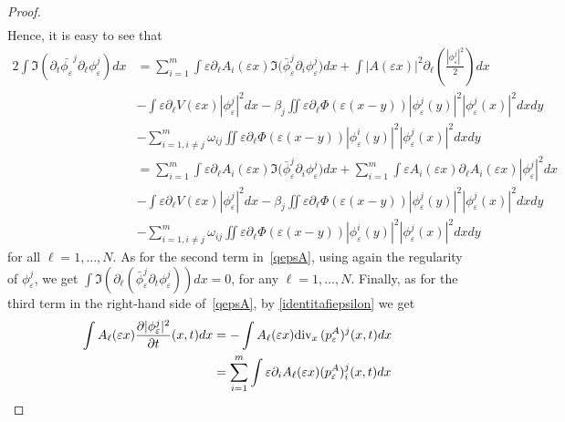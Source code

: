 \documentclass[11pt]{amsart}
\numberwithin{equation}{section}
\theoremstyle{definition}
\begin{document}
\begin{proof}
$$\begin{aligned}
\end{aligned}$$
Hence, it is easy to see that
\begin{equation}\label{termine1}
\begin{aligned}
2 \int
{{\Im}}(\partial_{t}\bar{\phi_{\varepsilon}}^j \partial_\ell\phi_{\varepsilon}^j)dx
& =  \sum_{i=1}^m \int
{\varepsilon}\partial_\ell
A_i({\varepsilon} x){{\Im}}\big(\bar\phi_{\varepsilon}^j\partial_i\phi_{\varepsilon}^j\big)dx
+\int|A({\varepsilon} x)|^2\partial_\ell\left(\frac{|\phi_{\varepsilon}^j|^2}{2}\right)dx\\
&  - \int {\varepsilon}\partial_\ell V({\varepsilon} x)|\phi_{\varepsilon}^j|^2dx -
\beta_j\iint
{\varepsilon}\partial_\ell\Phi({\varepsilon}(x-y))|\phi_{\varepsilon}^j(y)|^2|\phi_{\varepsilon}^j(x)|^2dxdy\\
&  -\sum_{i=1, i\not =j}^m\omega_{ij}\iint
{\varepsilon}\partial_\ell\Phi({\varepsilon}(x-y))|\phi_{\varepsilon}^i(y)|^2|\phi_{\varepsilon}^j(x)|^2dxdy \\
& = \sum_{i=1}^m \int
{\varepsilon}\partial_\ell
A_i({\varepsilon} x){{\Im}}\big(\bar\phi_{\varepsilon}^j\partial_i\phi_{\varepsilon}^j\big)dx
+\sum_{i=1}^m\int {\varepsilon} A_i({\varepsilon} x)\partial_\ell A_i({\varepsilon} x)|\phi_{\varepsilon}^j|^2dx\\
&  -  \int {\varepsilon}\partial_\ell V({\varepsilon} x)|\phi_{\varepsilon}^j|^2dx-
\beta_j\iint
{\varepsilon}\partial_\ell\Phi({\varepsilon}(x-y))|\phi_{\varepsilon}^j(y)|^2|\phi_{\varepsilon}^j(x)|^2dxdy\\
&  -\sum_{i=1, i\not =j}^m\omega_{ij}\iint
{\varepsilon}\partial_\ell\Phi({\varepsilon}(x-y))|\phi_{\varepsilon}^i(y)|^2|\phi_{\varepsilon}^j(x)|^2dxdy
\end{aligned}
\end{equation}
for all $\ell=1, \dots, N$. As for the second term in~\eqref{qepsA},
using again the regularity of $\phi_{\varepsilon}^j$, we get
$\int {{\Im}}\left(\partial_\ell(\bar{\phi}_{\varepsilon}^j\partial_t\phi_{\varepsilon}^j)\right)dx=0$,
for any $\ell=1, \dots, N$. Finally, as for the third
term in the right-hand side of~\eqref{qepsA}, by \eqref{identitafiepsilon} we get
\begin{equation}
    \label{termine3}
\begin{aligned}
\int A_\ell({\varepsilon} x)\frac{\partial |\phi_{\varepsilon}^j|^2}{\partial
t}(x,t)dx &=-\int A_\ell({\varepsilon} x){\rm div}_{x}\,
(p_{\varepsilon}^A)^j(x,t)dx \\
& =  \sum_{i=1}^{m}\int {\varepsilon}\partial_i A_\ell({\varepsilon} x) (p_{\varepsilon}^A)^j_i(x,t)dx\\

\end{aligned}
\end{equation}
\end{proof}
\end{document}
